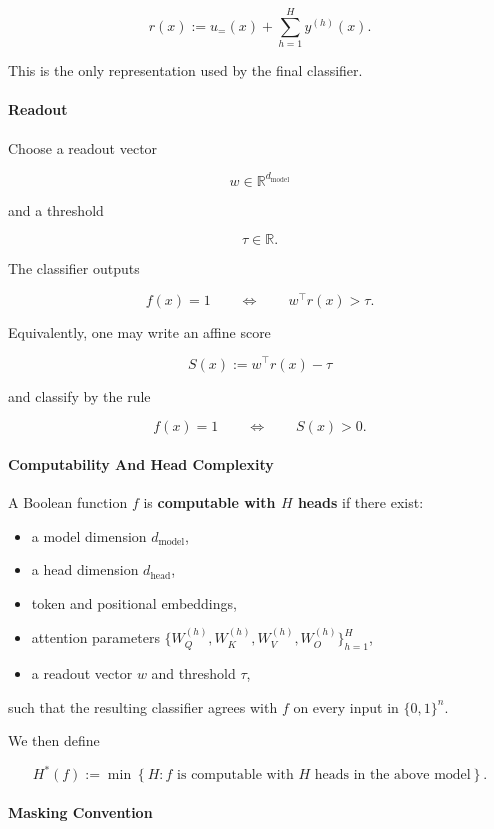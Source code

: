 \documentclass{article}
\theoremstyle{definition}
\theoremstyle{plain}
\begin{document}
\begin{sourcebox}
\[r(x) := u_=(x) + \sum_{h=1}^{H} y^{(h)}(x).\]

This is the only representation used by the final classifier.

\paragraph{Readout}

Choose a readout vector

\[w \in \mathbb{R}^{d_{\mathrm{model}}}\]

and a threshold

\[\tau \in \mathbb{R}.\]

The classifier outputs

\[f(x) = 1 \qquad \Longleftrightarrow \qquad w^\top r(x) > \tau.\]

Equivalently, one may write an affine score

\[S(x) := w^\top r(x) - \tau\]

and classify by the rule

\[f(x) = 1 \qquad \Longleftrightarrow \qquad S(x) > 0.\]

\paragraph{Computability And Head Complexity}

A Boolean function $f$ is \textbf{computable with $H$ heads} if there exist:

\begin{itemize}[leftmargin=*,nosep]
  \item a model dimension $d_{\mathrm{model}}$,
  \item a head dimension $d_{\mathrm{head}}$,
  \item token and positional embeddings,
  \item attention parameters $\lbrace W_Q^{(h)}, W_K^{(h)}, W_V^{(h)}, W_O^{(h)}\rbrace_{h=1}^{H}$,
  \item a readout vector $w$ and threshold $\tau$,
\end{itemize}

such that the resulting classifier agrees with $f$ on every input in $\lbrace 0,1\rbrace^n$.

We then define

\[H^{\ast}(f) := \min \left\lbrace H : f \text{ is computable with } H \text{ heads in the above model} \right\rbrace.\]

\paragraph{Masking Convention}


\end{sourcebox}
\end{document}
